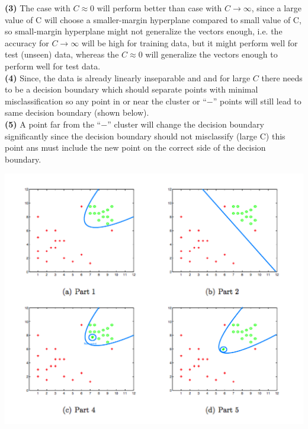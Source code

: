 \documentclass[]{report}
\begin{document}
	\textbf{(3)}
	The case with $C \approx 0$ will perform better than case with $C \rightarrow \infty$, since a large value of C will choose a smaller-margin hyperplane compared to small value of C, so small-margin hyperplane might not generalize the vectors enough, i.e. the accuracy for $C \rightarrow \infty$ will be high for training data, but it might perform well for test (unseen) data, whereas the $C \approx 0$ will generalize the vectors enough to perform well for test data.
	\\

	\textbf{(4)}
	Since, the data is already linearly inseparable and and for large $C$ there needs to be a decision boundary which should separate points with minimal misclassification so any point in or near the cluster or ``$-$'' points will still lead to same decision boundary (shown below).
	\\

	\textbf{(5)}
	A point far from the ``$-$'' cluster will change the decision boundary significantly since the decision boundary should not misclassify (large C) this point ans must include the new point on the correct side of the decision boundary.
	\\

	\begin{center}
		\includegraphics[width=\textwidth]{Problem-5}
	\end{center}
\end{document}
